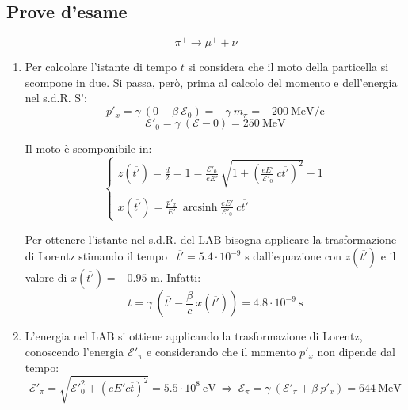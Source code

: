 \documentclass[12pt,twoside,a4]{article}
\DeclareMathOperator{\arcsinh}{arcsinh}
\begin{document}
\subsection{Prove d'esame}
\begin{solution}
\begin{equation}\label{eq: dec5.1}
    \pi^+ \rightarrow \mu^+ + \nu
\end{equation}
\begin{enumerate}[label=(\textit{\roman*})]
	\item Per calcolare l'istante di tempo $\overline{t}$ si considera che il moto della particella si scompone in due. Si passa, però, prima al calcolo del momento e dell'energia nel s.d.R. S': \begin{equation*}
   p'_x = \gamma \ (0 - \beta \ \mathcal{E}_0) = - \gamma \ m_\pi = - 200 \ \mathrm{MeV/c}   
\end{equation*}
\vspace{-6mm}
\begin{equation*}
   \mathcal{E}'_0 = \gamma \ (\mathcal{E} - 0) = 250 \ \mathrm{MeV}   
\end{equation*}

Il moto è scomponibile in: 
\begin{equation*}
    \begin{cases}
    z(\overline{t'}) = \frac{d}{2} = 1 = \frac{\mathcal{E}'_0}{eE'} \ \sqrt{1+ \left(\frac{eE'}{\mathcal{E}'_0} \ c\overline{t'}\right)^2} -1 \\
    \\
    x(\overline{t'}) = \frac{p'_x}{E'} \ \arcsinh{\frac{eE'}{\mathcal{E}'_0} \ c\overline{t'}}  
    
    \end{cases}
\end{equation*}

\bigskip
Per ottenere l'istante nel s.d.R. del LAB bisogna applicare la trasformazione di Lorentz stimando il tempo \ $\overline{t'} = 5.4 \cdot 10^{-9}$ s dall'equazione con $z(\overline{t'})$ e il valore di $x(\overline{t'}) = -0.95 $ m.
Infatti: \begin{equation*}
    \overline{t} = \gamma \ \left(\overline{t'} - \frac{\beta}{c} \ x(\overline{t'}) \right) = 4.8 \cdot 10^{-9} \ \mathrm{s} 
\end{equation*}

 
\item  L'energia nel LAB si ottiene applicando la trasformazione di Lorentz, conoscendo l'energia $\mathcal{E}'_\pi$ e considerando che il momento $p'_x$ non dipende dal tempo:
\begin{equation*}
    \mathcal{E}'_\pi = \sqrt{\mathcal{E}'^2_0 + (eE'c\overline{t})^2} = 5.5 \cdot 10^{8} \ \mathrm{eV}  \  \Rightarrow  \  \mathcal{E}_\pi = \gamma \ (\mathcal{E}'_\pi + \beta \ p'_x) = 644 \ \mathrm{MeV} 
\end{equation*}


\end{enumerate}
\end{solution}
\end{document}
